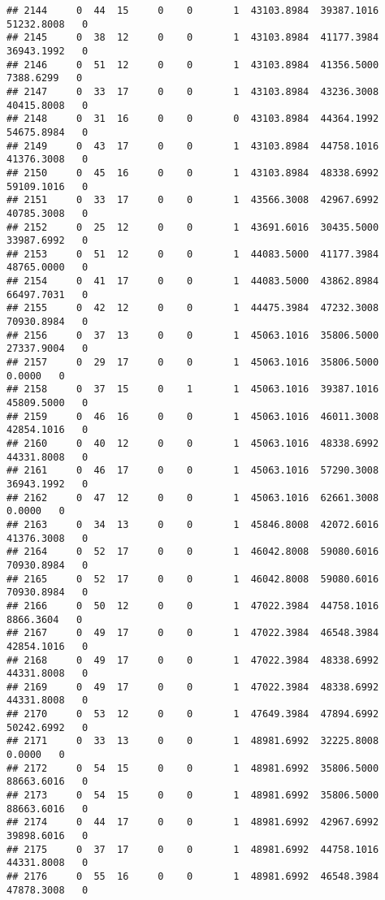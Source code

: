 \documentclass[
]{article}
\begin{document}
\begin{enumerate}
\begin{verbatim}
## 2144     0  44  15     0    0       1  43103.8984  39387.1016  51232.8008   0
## 2145     0  38  12     0    0       1  43103.8984  41177.3984  36943.1992   0
## 2146     0  51  12     0    0       1  43103.8984  41356.5000   7388.6299   0
## 2147     0  33  17     0    0       1  43103.8984  43236.3008  40415.8008   0
## 2148     0  31  16     0    0       0  43103.8984  44364.1992  54675.8984   0
## 2149     0  43  17     0    0       1  43103.8984  44758.1016  41376.3008   0
## 2150     0  45  16     0    0       1  43103.8984  48338.6992  59109.1016   0
## 2151     0  33  17     0    0       1  43566.3008  42967.6992  40785.3008   0
## 2152     0  25  12     0    0       1  43691.6016  30435.5000  33987.6992   0
## 2153     0  51  12     0    0       1  44083.5000  41177.3984  48765.0000   0
## 2154     0  41  17     0    0       1  44083.5000  43862.8984  66497.7031   0
## 2155     0  42  12     0    0       1  44475.3984  47232.3008  70930.8984   0
## 2156     0  37  13     0    0       1  45063.1016  35806.5000  27337.9004   0
## 2157     0  29  17     0    0       1  45063.1016  35806.5000      0.0000   0
## 2158     0  37  15     0    1       1  45063.1016  39387.1016  45809.5000   0
## 2159     0  46  16     0    0       1  45063.1016  46011.3008  42854.1016   0
## 2160     0  40  12     0    0       1  45063.1016  48338.6992  44331.8008   0
## 2161     0  46  17     0    0       1  45063.1016  57290.3008  36943.1992   0
## 2162     0  47  12     0    0       1  45063.1016  62661.3008      0.0000   0
## 2163     0  34  13     0    0       1  45846.8008  42072.6016  41376.3008   0
## 2164     0  52  17     0    0       1  46042.8008  59080.6016  70930.8984   0
## 2165     0  52  17     0    0       1  46042.8008  59080.6016  70930.8984   0
## 2166     0  50  12     0    0       1  47022.3984  44758.1016   8866.3604   0
## 2167     0  49  17     0    0       1  47022.3984  46548.3984  42854.1016   0
## 2168     0  49  17     0    0       1  47022.3984  48338.6992  44331.8008   0
## 2169     0  49  17     0    0       1  47022.3984  48338.6992  44331.8008   0
## 2170     0  53  12     0    0       1  47649.3984  47894.6992  50242.6992   0
## 2171     0  33  13     0    0       1  48981.6992  32225.8008      0.0000   0
## 2172     0  54  15     0    0       1  48981.6992  35806.5000  88663.6016   0
## 2173     0  54  15     0    0       1  48981.6992  35806.5000  88663.6016   0
## 2174     0  44  17     0    0       1  48981.6992  42967.6992  39898.6016   0
## 2175     0  37  17     0    0       1  48981.6992  44758.1016  44331.8008   0
## 2176     0  55  16     0    0       1  48981.6992  46548.3984  47878.3008   0

\end{verbatim}
\end{enumerate}
\end{document}

